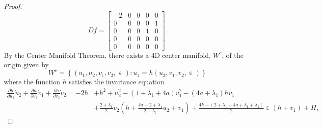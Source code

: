 \documentclass[10pt,a4paper]{amsart}
\DeclareMathOperator{\eps}{\varepsilon}
\begin{document}
\begin{proof}
\[ Df = \begin{bmatrix} -2 & 0 & 0 & 0 & 0 \\ 0 & 0 & 0 & 0 & 1 \\ 0 & 0 & 0 & 1 & 0 \\ 0 & 0 & 0 & 0 & 0 \\ 0 & 0 & 0 & 0 & 0 \end{bmatrix}. \]
%
By the Center Manifold Theorem, there exists a 4D center manifold, $W^c$, of the origin given by 
%
\[ W^c = \left\{ (u_1,u_2,v_1,v_2,\eps) : u_1 = h(u_2,v_1,v_2,\eps) \right\} \]
%
where the function $h$ satisfies the invariance equation 
%
\begin{equation*} 
  \begin{split}
\tfrac{\partial h}{\partial u_2} \dot u_2 + \tfrac{\partial h}{\partial v_1} \dot v_1 + \tfrac{\partial h}{\partial v_2} \dot v_2 = -2h &+ h^2+u_2^2-(1+\lambda_1+4a)v_1^2-(4a+\lambda_1) h v_1  \\ 
& + \tfrac{2+\lambda_1}{2} v_2 \left( h+\tfrac{4a+2+\lambda_1}{2+\lambda_1}u_2 + v_1 \right) + \tfrac{4k-(2+\lambda_1+4a+\lambda_1+\lambda_2)}{2} \eps (h+v_1) + H,

\end{split}
\end{equation*}
\end{proof}
\end{document}
